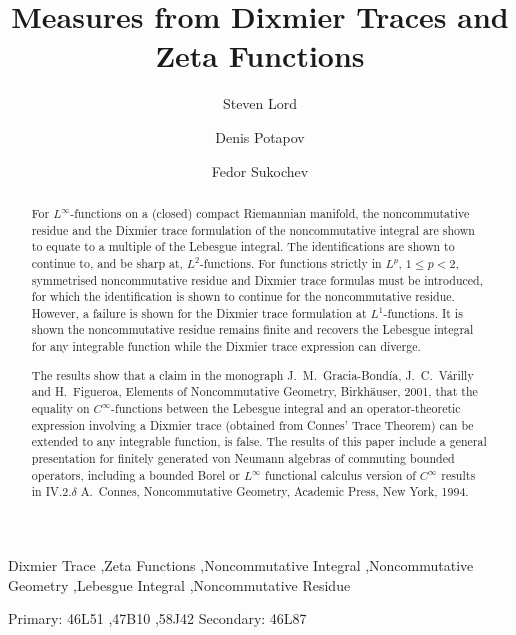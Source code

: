 \documentclass[final,1p]{elsarticle}
\numberwithin{equation}{section}
\theoremstyle{plain}
\theoremstyle{definition}
\begin{document}

\begin{frontmatter}

\title{Measures from Dixmier Traces and Zeta Functions}

  
\author[adl,syd]{Steven Lord}
\author[syd]{Denis Potapov}
\author[syd]{Fedor Sukochev}


\address[adl]{School of Mathematical Sciences, University of Adelaide, Adelaide, 5005, Australia.}
\address[syd]{School of Mathematics and Statistics, University of New South Wales, Sydney, 2052, Australia.}

\begin{abstract} 

For $L^\infty$-functions on a (closed) compact Riemannian manifold, the noncommutative residue and the Dixmier trace formulation of the noncommutative integral are shown to equate to a multiple of the Lebesgue integral. 
The identifications are shown to continue to, and be sharp at, $L^2$-functions.  For functions strictly in $L^p$, $1 \leq p < 2$,
symmetrised noncommutative residue and Dixmier trace formulas must be introduced, for which the identification
is shown to continue for the noncommutative residue.
However, a failure is shown for the Dixmier trace formulation at $L^1$-functions.   It is shown the noncommutative residue remains finite and recovers the Lebesgue integral for any integrable function while the Dixmier trace expression can diverge.

The results show that a claim in the monograph J.~M.~Gracia-Bond{\'{i}}a, J.~C.~V{\'{a}}rilly and H.~Figueroa,
Elements of Noncommutative Geometry, Birkh\"{a}user, 2001, that 
the equality on $C^\infty$-functions between the Lebesgue integral
and an operator-theoretic expression involving a Dixmier trace (obtained from Connes' Trace Theorem) can be extended to any integrable function, is false.
The results of this paper include a general presentation
for finitely generated von Neumann algebras of commuting bounded operators, including a bounded Borel or $L^\infty$ functional calculus version of $C^\infty$ results in IV.2.$\delta$ A.~Connes, Noncommutative Geometry, Academic Press, New York, 1994.

\end{abstract}

\begin{keyword}
Dixmier Trace \sep Zeta Functions \sep Noncommutative Integral \sep Noncommutative Geometry \sep Lebesgue Integral \sep Noncommutative Residue

\medskip \MSC Primary: 46L51 \sep 47B10 \sep 58J42 Secondary: 46L87
\end{keyword}

\end{frontmatter}
\end{document}
